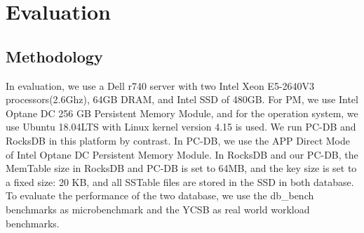 \section{Evaluation}
\subsection{Methodology}
In evaluation, we use a Dell r740 server with two Intel Xeon E5-2640V3 processors(2.6Ghz), 64GB DRAM, and Intel SSD of 480GB. For PM, we use Intel Optane DC 256 GB Persistent Memory Module, and for the operation system, we use Ubuntu 18.04LTS with Linux kernel version 4.15 is used.
We run PC-DB and RocksDB in this platform by contrast. In PC-DB, we use the APP Direct Mode of Intel Optane DC Persistent Memory Module. In RocksDB and our PC-DB, the MemTable size in RocksDB and PC-DB is set to 64MB, and the key size is set to a fixed size: 20 KB, and all SSTable files are stored in the SSD in both database. 
To evaluate the performance of the two database, we use the db\_bench benchmarks as microbenchmark and the YCSB as real world workload benchmarks.   
